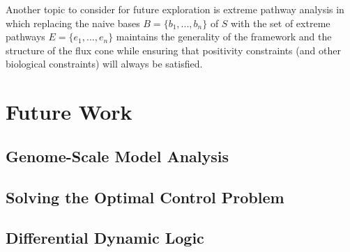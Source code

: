 Another topic to consider for future exploration is extreme pathway analysis in which replacing the naive bases $B = \{b_1, ..., b_n\}$ of $S$ with the set of extreme pathways $E = \{e_1, ..., e_n\}$ maintains the generality of the framework and the structure of the flux cone while ensuring that positivity constraints (and other biological constraints) will always be satisfied. 

 \section{Future Work}

 \subsection{Genome-Scale Model Analysis}


\subsection{Solving the Optimal Control Problem}

 \subsection{Differential Dynamic Logic}

